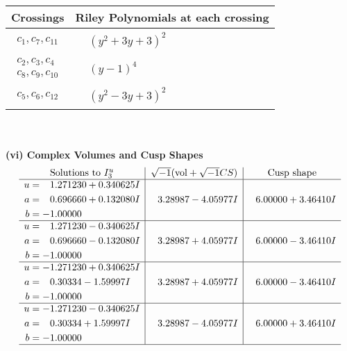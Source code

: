 \documentclass[1p]{elsarticle_modified}
\theoremstyle{definition}
\newcommand{\I}{\sqrt{-1}}
\begin{document}
\begin{tabular}{m{50pt}|m{274pt}}
Crossings & \hspace{64pt}Riley Polynomials at each crossing \\
\hline $$\begin{aligned}c_{1},c_{7},c_{11}\end{aligned}$$&$\begin{aligned}
&(y^2+3 y+3)^2
\end{aligned}$\\
\hline $$\begin{aligned}c_{2},c_{3},c_{4}\\c_{8},c_{9},c_{10}\end{aligned}$$&$\begin{aligned}
&(y-1)^4
\end{aligned}$\\
\hline $$\begin{aligned}c_{5},c_{6},c_{12}\end{aligned}$$&$\begin{aligned}
&(y^2-3 y+3)^2
\end{aligned}$\\
\hline
\end{tabular}\\~\\
\newpage\flushleft \textbf{(vi) Complex Volumes and Cusp Shapes}
$$\begin{array}{c|c|c}  
\text{Solutions to }I^u_{3}& \I (\text{vol} + \sqrt{-1}CS) & \text{Cusp shape}\\
 \hline 
\begin{aligned}
u &= \phantom{-}1.271230 + 0.340625 I \\
a &= \phantom{-}0.696660 + 0.132080 I \\
b &= -1.00000\phantom{ +0.000000I}\end{aligned}
 & \phantom{-}3.28987 - 4.05977 I & \phantom{-}6.00000 + 3.46410 I \\ \hline\begin{aligned}
u &= \phantom{-}1.271230 - 0.340625 I \\
a &= \phantom{-}0.696660 - 0.132080 I \\
b &= -1.00000\phantom{ +0.000000I}\end{aligned}
 & \phantom{-}3.28987 + 4.05977 I & \phantom{-}6.00000 - 3.46410 I \\ \hline\begin{aligned}
u &= -1.271230 + 0.340625 I \\
a &= \phantom{-}0.30334 - 1.59997 I \\
b &= -1.00000\phantom{ +0.000000I}\end{aligned}
 & \phantom{-}3.28987 + 4.05977 I & \phantom{-}6.00000 - 3.46410 I \\ \hline\begin{aligned}
u &= -1.271230 - 0.340625 I \\
a &= \phantom{-}0.30334 + 1.59997 I \\
b &= -1.00000\phantom{ +0.000000I}\end{aligned}
 & \phantom{-}3.28987 - 4.05977 I & \phantom{-}6.00000 + 3.46410 I\\
 \hline 
 \end{array}$$\newpage\newpage\renewcommand{\arraystretch}{1}
\end{document}
